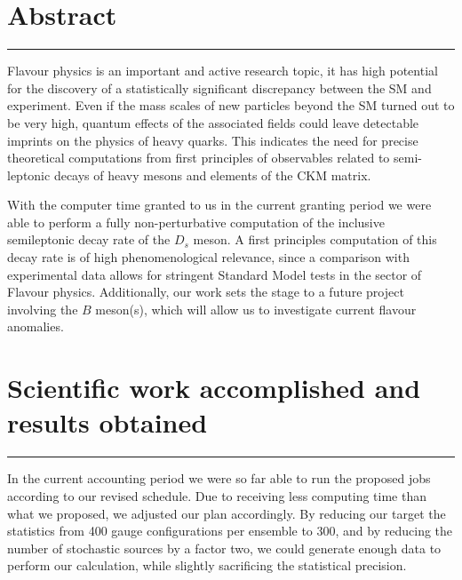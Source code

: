 \documentclass [a4paper, 11pt]{article}
\begin{document}
\newpage

\vfill
\tableofcontents
\vfill

\newpage

\section{Abstract}\label{sec:abstract}
\rule{\textwidth}{0.4pt}


Flavour physics is an important and active research topic, it has high potential
for the discovery of a statistically significant discrepancy between the SM and
experiment.
Even if the mass scales of new
particles beyond the SM turned out to be very high, quantum effects of
the associated fields could leave detectable imprints on the physics
of heavy quarks.
This indicates the need for precise theoretical computations from
first principles of observables related to semi-leptonic decays of
heavy mesons and elements of the CKM matrix. 

With the computer time granted to us in the current granting period we
were able to perform a fully non-perturbative computation of the inclusive semileptonic
decay rate of the $D_s$ meson.
A first principles computation of this decay rate is of high
phenomenological relevance, since a comparison with experimental data
allows for stringent Standard Model tests in the sector of Flavour physics.
Additionally, our work sets the stage to a future
project involving the $B$ meson(s), which will allow us to
investigate current flavour anomalies.



\section{Scientific work accomplished and results obtained}\label{sec:results}
\rule{\textwidth}{0.4pt}

In the current accounting period we were so far able to run the
proposed jobs according to our revised schedule. 
Due to receiving less computing time than what we proposed, we adjusted our plan
accordingly.
By reducing our target the statistics from 400 gauge
configurations per ensemble to 300, and by reducing the
number of stochastic sources by a factor two,
we could
generate enough data to perform our calculation, while slightly
sacrificing the statistical precision. 
\end{document}
